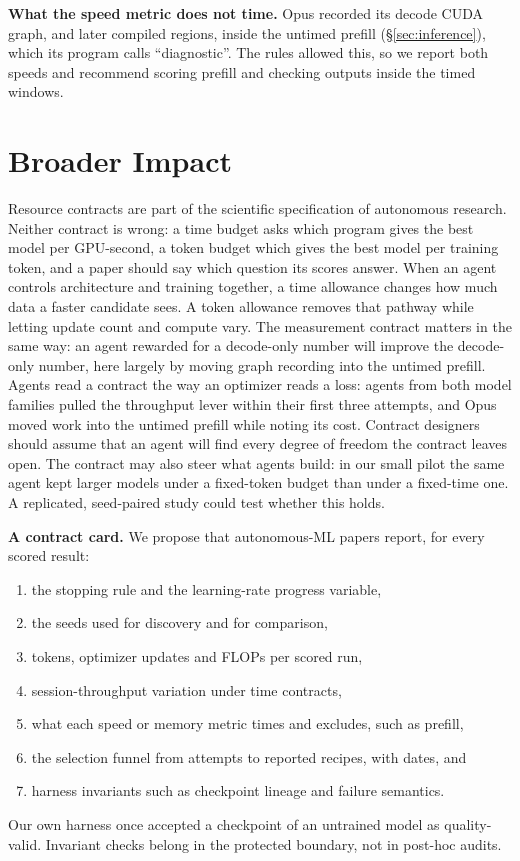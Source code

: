 \documentclass{article}
\newif\ifshowhumanmarkers \showhumanmarkersfalse
\newcommand{\humantag}[1]{{\color{humanframe}\sffamily\scriptsize\bfseries HUMAN AUTHOR MUST REWRITE/VERIFY [#1]}\ }
\newcommand{\humanauthor}[2][]{\ifshowhumanmarkers\begin{humanbox}\humantag{#1}#2\end{humanbox}\else #2\par\fi}
\begin{document}
\humanauthor[P2-16 r6]{ \textbf{What the speed metric does not time.} Opus recorded its decode CUDA graph, and later compiled regions, inside the untimed prefill (\S\ref{sec:inference}), which its program calls ``diagnostic''. The rules allowed this, so we report both speeds and recommend scoring prefill and checking outputs inside the timed windows.}
\label{parttwoend}

\clearpage
\section{Broader Impact}\label{partthree}
Resource contracts are part of the scientific specification of autonomous research. Neither contract is wrong: a time budget asks which program gives the best model per GPU-second, a token budget which gives the best model per training token, and a paper should say which question its scores answer. When an agent controls architecture and training together, a time allowance changes how much data a faster candidate sees. A token allowance removes that pathway while letting update count and compute vary. The measurement contract matters in the same way: an agent rewarded for a decode-only number will improve the decode-only number, here largely by moving graph recording into the untimed prefill. Agents read a contract the way an optimizer reads a loss: agents from both model families pulled the throughput lever within their first three attempts, and Opus moved work into the untimed prefill while noting its cost. Contract designers should assume that an agent will find every degree of freedom the contract leaves open. The contract may also steer what agents build: in our small pilot the same agent kept larger models under a fixed-token budget than under a fixed-time one. A replicated, seed-paired study could test whether this holds.

\textbf{A contract card.} We propose that autonomous-ML papers report, for every scored result:
{\setlength{\leftmargini}{1.6em}\begin{enumerate}\setlength{\itemsep}{0pt}\setlength{\parskip}{0pt}\setlength{\topsep}{2pt}
\item the stopping rule and the learning-rate progress variable,
\item the seeds used for discovery and for comparison,
\item tokens, optimizer updates and FLOPs per scored run,
\item session-throughput variation under time contracts,
\item what each speed or memory metric times and excludes, such as prefill,
\item the selection funnel from attempts to reported recipes, with dates, and
\item harness invariants such as checkpoint lineage and failure semantics.
\end{enumerate}}
\noindent Our own harness once accepted a checkpoint of an untrained model as quality-valid. Invariant checks belong in the protected boundary, not in post-hoc audits.
\end{document}
